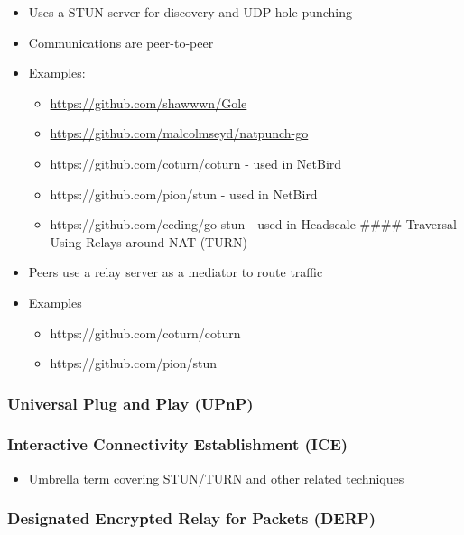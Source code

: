 \begin{itemize}
\tightlist
\item
  Uses a STUN server for discovery and UDP hole-punching
\item
  Communications are peer-to-peer
\item
  Examples:

  \begin{itemize}
  \tightlist
  \item
    \url{https://github.com/shawwwn/Gole}
  \item
    \url{https://github.com/malcolmseyd/natpunch-go}
  \item
    https://github.com/coturn/coturn - used in NetBird
  \item
    https://github.com/pion/stun - used in NetBird
  \item
    https://github.com/ccding/go-stun - used in Headscale \#\#\#\#
    Traversal Using Relays around NAT (TURN)
  \end{itemize}
\item
  Peers use a relay server as a mediator to route traffic
\item
  Examples

  \begin{itemize}
  \tightlist
  \item
    https://github.com/coturn/coturn
  \item
    https://github.com/pion/stun
  \end{itemize}
\end{itemize}

\hypertarget{universal-plug-and-play-upnp}{%
\subsubsection{Universal Plug and Play
(UPnP)}\label{universal-plug-and-play-upnp}}

\hypertarget{interactive-connectivity-establishment-ice}{%
\subsubsection{Interactive Connectivity Establishment
(ICE)}\label{interactive-connectivity-establishment-ice}}

\begin{itemize}
\tightlist
\item
  Umbrella term covering STUN/TURN and other related techniques
\end{itemize}

\hypertarget{designated-encrypted-relay-for-packets-derp}{%
\subsubsection{Designated Encrypted Relay for Packets
(DERP)}\label{designated-encrypted-relay-for-packets-derp}}

